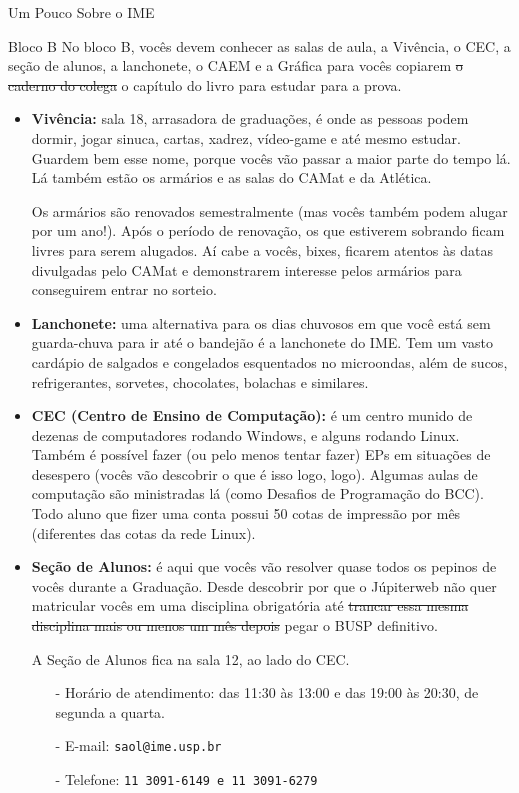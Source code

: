 \begin{secao}{Um Pouco Sobre o IME}
\begin{subsecao}{Bloco B}
No bloco B, vocês devem conhecer as salas de aula, a Vivência, o CEC, 
a seção de alunos, a lanchonete, o CAEM e a Gráfica para vocês 
copiarem \sout{o caderno do colega} o capítulo do livro para estudar para a prova.

\begin{itemize}
\item {\bf Vivência:} sala 18, arrasadora de graduações, é onde as pessoas podem
dormir, jogar sinuca, cartas, xadrez, vídeo-game e até
mesmo estudar. Guardem bem esse nome, porque vocês vão passar a maior parte do tempo lá.
Lá também estão os armários e as salas do CAMat e da Atlética.

Os armários são renovados semestralmente (mas vocês também podem alugar por um ano!). 
Após o período de renovação, os que estiverem sobrando ficam livres para serem alugados. 
Aí cabe a vocês, bixes, ficarem atentos às datas divulgadas pelo CAMat e demonstrarem 
interesse pelos armários para conseguirem entrar no sorteio.

\item {\bf Lanchonete:} uma alternativa para os dias chuvosos em que você está sem
  guarda-chuva para ir até o bandejão é a lanchonete do IME. Tem um vasto
  cardápio de salgados e congelados esquentados no microondas, além de sucos,
  refrigerantes, sorvetes, chocolates, bolachas e similares.

\item {\bf CEC (Centro de Ensino de Computação):} é um centro munido de dezenas
de computadores rodando Windows, e alguns rodando Linux. Também é possível fazer
(ou pelo menos tentar fazer) EPs em situações de desespero (vocês vão descobrir o que é
isso logo, logo). Algumas aulas de computação são ministradas lá (como Desafios
de Programação do BCC). Todo aluno que fizer uma conta possui 50 cotas de impressão
por mês (diferentes das cotas da rede Linux).

\item {\bf Seção de Alunos:} é aqui que vocês vão resolver quase todos os
pepinos de vocês durante a Graduação. Desde descobrir por que o Júpiterweb não
quer matricular vocês em uma disciplina obrigatória até \sout{trancar essa mesma
disciplina mais ou menos um mês depois} pegar o BUSP definitivo. %

A Seção de Alunos fica na sala 12, ao lado do CEC.
\begin{itemize}
\item[-] Horário de atendimento: das 11:30 às 13:00 e das 19:00 às 20:30, de segunda a quarta.
\item[-] E-mail: \tt{saol@ime.usp.br}
\item[-] Telefone: \tt{11 3091-6149} e \tt{11 3091-6279}
\end{itemize}


\end{itemize}
\end{subsecao}
\end{secao}
